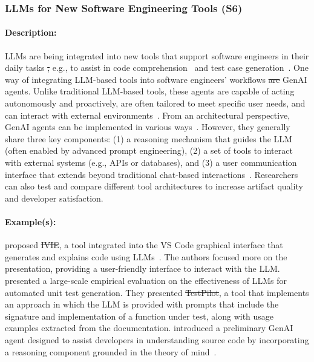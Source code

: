 \documentclass[smallextended]{svjour3}
\newcommand{\studytypesubsection}[1]{\subsubsection{#1}}
\newcommand{\studytypeparagraph}[1]{\paragraph{\bfseries #1:}}
\providecommand{\DIFaddtex}[1]{{\protect\color{blue}\uwave{#1}}} %
\providecommand{\DIFdeltex}[1]{{\protect\color{red}\sout{#1}}}                      %
\providecommand{\DIFaddbegin}{} %
\providecommand{\DIFaddend}{} %
\providecommand{\DIFdelbegin}{} %
\providecommand{\DIFdelend}{} %
\providecommand{\DIFadd}[1]{\texorpdfstring{\DIFaddtex{#1}}{#1}} %
\providecommand{\DIFdel}[1]{\texorpdfstring{\DIFdeltex{#1}}{}} %
\newcommand{\DIFscaledelfig}{0.5}
\newlength{\DIFdelgraphicswidth} %
\newlength{\DIFdelgraphicsheight} %
\newcommand{\DIFaddincludegraphics}[2][]{{\color{blue}\fbox{\DIFOincludegraphics[#1]{#2}}}} %
\newcommand{\DIFdelincludegraphics}[2][]{%
\sbox{\DIFdelgraphicsbox}{\DIFOincludegraphics[#1]{#2}}%
\settoboxwidth{\DIFdelgraphicswidth}{\DIFdelgraphicsbox} %
\settoboxtotalheight{\DIFdelgraphicsheight}{\DIFdelgraphicsbox} %
\scalebox{\DIFscaledelfig}{%
\parbox[b]{\DIFdelgraphicswidth}{\usebox{\DIFdelgraphicsbox}\\[-\baselineskip] \rule{\DIFdelgraphicswidth}{0em}}\llap{\resizebox{\DIFdelgraphicswidth}{\DIFdelgraphicsheight}{%
\setlength{\unitlength}{\DIFdelgraphicswidth}%
\begin{picture}(1,1)%
\thicklines\linethickness{2pt} %
{\color[rgb]{1,0,0}\put(0,0){\framebox(1,1){}}}%
{\color[rgb]{1,0,0}\put(0,0){\line( 1,1){1}}}%
{\color[rgb]{1,0,0}\put(0,1){\line(1,-1){1}}}%
\end{picture}%
}\hspace*{3pt}}} %
} %
\DeclareRobustCommand{\DIFaddbegin}{\DIFOaddbegin \let\includegraphics\DIFaddincludegraphics} %
\DeclareRobustCommand{\DIFaddend}{\DIFOaddend \let\includegraphics\DIFOincludegraphics} %
\DeclareRobustCommand{\DIFdelbegin}{\DIFOdelbegin \let\includegraphics\DIFdelincludegraphics} %
\DeclareRobustCommand{\DIFdelend}{\DIFOaddend \let\includegraphics\DIFOincludegraphics} %
\begin{document}
\DIFdelend \DIFaddbegin \studytypesubsection{LLMs for New Software Engineering Tools (S6)}
\DIFaddend \label{sec:llms-for-new-software-engineering-tools}

\studytypeparagraph{Description}

LLMs are being integrated into new tools that support software engineers in their daily tasks \DIFdelbegin \DIFdel{, }\DIFdelend \DIFaddbegin \DIFadd{(}\DIFaddend e.g., to assist in code comprehension~\cite{DBLP:conf/chi/YanHWH24} and test case generation~\cite{DBLP:journals/tse/SchaferNET24}\DIFaddbegin \DIFadd{)}\DIFaddend .
One way of integrating LLM-based tools into software engineers' workflows \DIFdelbegin \DIFdel{are }\DIFdelend \DIFaddbegin \DIFadd{is using }\DIFaddend GenAI agents.
Unlike traditional LLM-based tools, these agents are capable of acting autonomously and proactively, are often tailored to meet specific user needs, and can interact with external environments~\cite{takerngsaksiri2024human,wiesinger2025agents}.
From an architectural perspective, GenAI agents can be implemented in various ways~\cite{wiesinger2025agents}.
However, they generally share three key components: (1) a reasoning mechanism that guides the LLM (often enabled by advanced prompt engineering), (2) a set of tools to interact with external systems (e.g., APIs or databases), and (3) a user communication interface that extends beyond traditional chat-based interactions~\cite{DBLP:conf/icsm/RichardsW24, DBLP:journals/tmlr/SumersYN024, DBLP:journals/corr/abs-2309-07870}.
Researchers can also test and compare different tool architectures to increase artifact quality and developer satisfaction.

\studytypeparagraph{Example(s)}

\citeauthor{DBLP:conf/chi/YanHWH24} proposed \DIFdelbegin \DIFdel{IVIE}\DIFdelend \DIFaddbegin \emph{\DIFadd{IVIE}}\DIFaddend , a tool integrated into the VS Code graphical interface that generates and explains code using LLMs~\cite{DBLP:conf/chi/YanHWH24}.
The authors focused more on the presentation, providing a user-friendly interface to interact with the LLM. 
\citeauthor{DBLP:journals/tse/SchaferNET24}~\cite{DBLP:journals/tse/SchaferNET24} presented a large-scale empirical evaluation on the effectiveness of LLMs for automated unit test generation.
They presented \DIFdelbegin \DIFdel{TestPilot}\DIFdelend \DIFaddbegin \emph{\DIFadd{TestPilot}}\DIFaddend , a tool that implements an approach in which the LLM is provided with prompts that include the signature and implementation of a function under test, along with usage examples extracted from the documentation.
\citeauthor{DBLP:conf/icsm/RichardsW24} introduced a preliminary GenAI agent designed to assist developers in understanding source code by incorporating a reasoning component grounded in the theory of mind~\cite{DBLP:conf/icsm/RichardsW24}.
\end{document}
